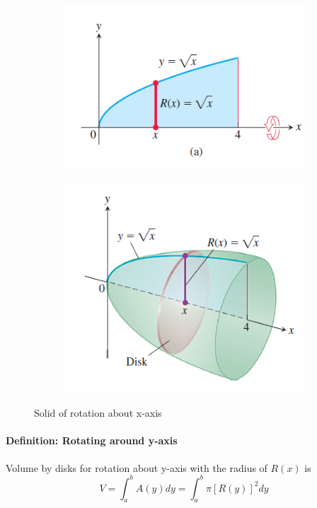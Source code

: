 \documentclass[12pt]{article}
\begin{document}
\begin{figure}[H]
     \centering
     \begin{subfigure}[b]{0.4\linewidth} 
          \includegraphics[width = 1\linewidth]{Images/solid of rev.png}
     \end{subfigure}
     \begin{subfigure}[b]{0.4\linewidth} 
        \includegraphics[width = 1\linewidth]{Images/solid of rev 2.png}
   \end{subfigure}
   \caption{Solid of rotation about x-axis}
\end{figure}
\paragraph{Definition: Rotating around y-axis}
Volume by disks for rotation about y-axis with the radius of $R(x)$ is
\[
    V = \int_a^b A(y) dy = \int_a^b \pi [R(y)]^2 dy
\]
\end{document}
